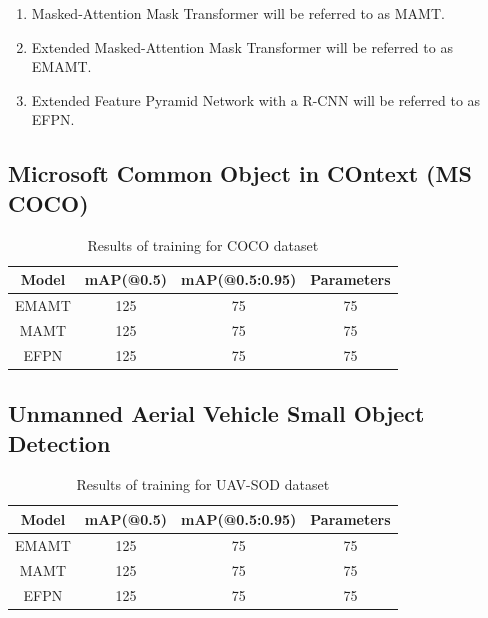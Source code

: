 \begin{enumerate}
    \item Masked-Attention Mask Transformer will be referred to as MAMT.
    \item Extended Masked-Attention Mask Transformer will be referred to as EMAMT.
    \item Extended Feature Pyramid Network with a R-CNN will be referred to as EFPN.
\end{enumerate}


\subsection{Microsoft Common Object in COntext (MS COCO)}

\begin{table}[h]
    \centering
    \begin{tabular}{|c|c|c|c|}
        \hline
        \textbf{Model}     & \textbf{mAP(@0.5)}     & \textbf{mAP(@0.5:0.95)}  & \textbf{Parameters}   \\ \hline
        EMAMT              & 125                    & 75                       & 75                    \\ \hline
        MAMT               & 125                    & 75                       & 75                    \\ \hline
        EFPN               & 125                    & 75                       & 75                    \\ \hline
    \end{tabular}
    \caption{Results of training for COCO dataset}
    \label{tab:coco_results}
\end{table}



\subsection{Unmanned Aerial Vehicle Small Object Detection}
\begin{table}[h]
    \centering
    \begin{tabular}{|c|c|c|c|}
        \hline
        \textbf{Model}     & \textbf{mAP(@0.5)}     & \textbf{mAP(@0.5:0.95)}  & \textbf{Parameters}   \\ \hline
        EMAMT              & 125                    & 75                       & 75                    \\ \hline
        MAMT               & 125                    & 75                       & 75                    \\ \hline    
        EFPN               & 125                    & 75                       & 75                    \\ \hline
    \end{tabular}
    \caption{Results of training for UAV-SOD dataset}
    \label{tab:uav_results}
\end{table}





